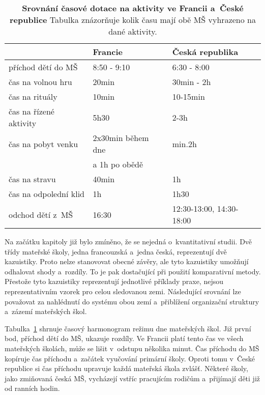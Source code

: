 \begin{table}[h]
	\center
	\begin{tabular}{|l|l|l|}
	\hline
	\rowcolor{grey}
								& \textbf{Francie}				& \textbf{Česká republika}	\\
	\hline
	\hline
\rowcolor{grey!10}	 příchod dětí do MŠ			& 8:50 - 9:10				& 6:30 - 8:00			\\ 
\rowcolor{grey!50}	 čas na volnou hru 			& 20min 					&30min - 2h 	\\ 
\rowcolor{grey!10}	 čas na rituály 			&10min 						&10-15min \\
\rowcolor{grey!50}	 čas na řízené aktivity		&5h30 						&2-3h   \\ 
\rowcolor{grey!10}	 čas na pobyt venku     	&2x30min během dne			&min.2h 	\\ 
\rowcolor{grey!10}								&a 1h po obědě				& \\ 
\rowcolor{grey!50}	 čas na stravu				&40min						&1h \\
\rowcolor{grey!10}	 čas na odpolední klid 	 	&1h 						&1h30 	\\
\rowcolor{grey!50}	 odchod dětí z~MŠ			&16:30						&12:30-13:00, 14:30-18:00	\\														 
	 \hline
	  
	\end{tabular}
	
	\caption{ \textbf{Srovnání časové dotace na aktivity ve Francii a~České republice} Tabulka znázorňuje kolik času mají obě MŠ vyhrazeno na dané aktivity.
	}
	\label{srovnanirezimdne}
\end{table}


	Na začátku kapitoly již bylo zmíněno, že se nejedná o~kvantitativní studii. Dvě třídy mateřské školy, jedna francouzská a~jedna česká, reprezentují dvě kazuistiky. Proto nelze stanovovat obecné závěry, ale tyto kazuistiky umožňují odhalovat shody a~rozdíly. To je pak dostačující při použití komparativní metody. Přestože tyto kazuistiky reprezentují jednotlivé příklady praxe, nejsou reprezentativním vzorek pro celou sledovanou zemi. Následující srovnání lze považovat za nahlédnutí do systému obou zemí a~přiblížení organizační struktury a~zázemí mateřských škol.

	Tabulka~\ref{srovnanirezimdne} shrnuje časový harmonogram režimu dne mateřských škol. Již první bod, příchod dětí do MŠ, ukazuje rozdíly. Ve Francii platí tento čas ve všech mateřských školách, může se lišit v~odstupu několika minut. Čas příchodu do MŠ kopíruje čas příchodu a~začátek vyučování primární školy. Oproti tomu v~České republice si čas příchodu upravuje každá mateřská škola zvlášť. Některé školy, jako zmiňovaná česká MŠ, vycházejí vstříc pracujícím rodičům a~přijímají děti již od ranních hodin.


